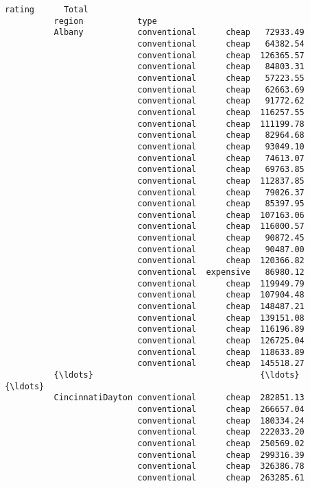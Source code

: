 \documentclass[11pt]{article}
\begin{document}
\begin{Verbatim}[commandchars=\\\{\}]
                                            rating      Total  
          region           type                                
          Albany           conventional      cheap   72933.49  
                           conventional      cheap   64382.54  
                           conventional      cheap  126365.57  
                           conventional      cheap   84803.31  
                           conventional      cheap   57223.55  
                           conventional      cheap   62663.69  
                           conventional      cheap   91772.62  
                           conventional      cheap  116257.55  
                           conventional      cheap  111199.78  
                           conventional      cheap   82964.68  
                           conventional      cheap   93049.10  
                           conventional      cheap   74613.07  
                           conventional      cheap   69763.85  
                           conventional      cheap  112837.85  
                           conventional      cheap   79026.37  
                           conventional      cheap   85397.95  
                           conventional      cheap  107163.06  
                           conventional      cheap  116000.57  
                           conventional      cheap   90872.45  
                           conventional      cheap   90487.00  
                           conventional      cheap  120366.82  
                           conventional  expensive   86980.12  
                           conventional      cheap  119949.79  
                           conventional      cheap  107904.48  
                           conventional      cheap  148487.21  
                           conventional      cheap  139151.08  
                           conventional      cheap  116196.89  
                           conventional      cheap  126725.04  
                           conventional      cheap  118633.89  
                           conventional      cheap  145518.27  
          {\ldots}                                  {\ldots}        {\ldots}  
          CincinnatiDayton conventional      cheap  282851.13  
                           conventional      cheap  266657.04  
                           conventional      cheap  180334.24  
                           conventional      cheap  222033.20  
                           conventional      cheap  250569.02  
                           conventional      cheap  299316.39  
                           conventional      cheap  326386.78  
                           conventional      cheap  263285.61  

\end{Verbatim}
\end{document}

